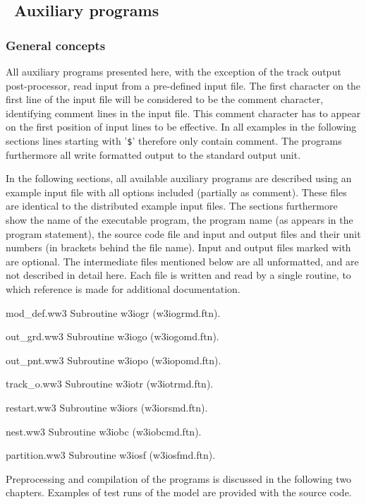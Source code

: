 \vssub
\subsection{~Auxiliary programs} \label{sec:auxprog}
\vsssub
\subsubsection{General concepts}
\vsssub

All auxiliary programs presented here, with the exception of the track output
post-processor, read input from a pre-defined input file. The first character
on the first line of the input file will be considered to be the comment
character, identifying comment lines in the input file. This comment character
has to appear on the first position of input lines to be effective. In all
examples in the following sections lines starting with '{\tt \$}' therefore
only contain comment. The programs furthermore all write formatted output to
the standard output unit.

In the following sections, all available auxiliary programs are described
using an example input file with all options included (partially as
comment). These files are identical to the distributed example input
files. The sections furthermore show the name of the executable program, the
program name (as appears in the program statement), the source code file and
input and output files and their unit numbers (in brackets behind the file
name). Input and output files marked with \opt are optional. The intermediate
files mentioned below are all {\F unformatted}, and are not described in
detail here. Each file is written and read by a single routine, to which
reference is made for additional documentation.

\begin{list}{}{\itemsep 0mm \parsep 0mm \leftmargin 40mm }
\item[{mod\_def.ww3} \hfill] Subroutine {\F w3iogr} ({\file w3iogrmd.ftn}).
\item[{out\_grd.ww3} \hfill] Subroutine {\F w3iogo} ({\file w3iogomd.ftn}).
\item[{out\_pnt.ww3} \hfill] Subroutine {\F w3iopo} ({\file w3iopomd.ftn}).
\item[{track\_o.ww3} \hfill] Subroutine {\F w3iotr} ({\file w3iotrmd.ftn}).
\item[{restart.ww3}  \hfill] Subroutine {\F w3iors} ({\file w3iorsmd.ftn}).
\item[{nest.ww3}     \hfill] Subroutine {\F w3iobc} ({\file w3iobcmd.ftn}).
\item[{partition.ww3}\hfill] Subroutine {\F w3iosf} ({\file w3iosfmd.ftn}).
\end{list}

\noindent
Preprocessing and compilation of the programs is discussed in the following
two chapters. Examples of test runs of the model are provided with the source
code.

\pb